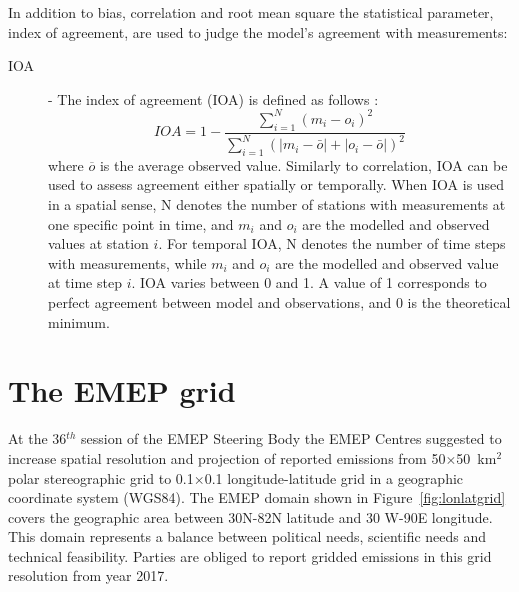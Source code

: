 In addition to bias, correlation and root mean square the statistical
parameter, index of agreement, are used to judge the model's agreement
with measurements:\\
\begin{description}
     \item[IOA]  - The index of agreement (IOA) is defined as follows
     \citep{Willmott1981, Willmott1982}:
\begin{equation}
IOA=1-\frac{\sum_{i=1}^{N}(m_i-o_i)^2}{\sum_{i=1}^{N}(|m_i-\bar{o}|+|o_i-\bar{o}|)^2}
\label{eq:IOA}
\end{equation}
     where $\overline{o}$ is the average observed value. Similarly to
     correlation, IOA can be used to assess agreement either
     spatially or temporally.
     When IOA is used in a spatial sense, N denotes the number of stations
     with measurements at one specific point in time, and $m_i$ and $o_i$
     are the modelled and observed values at station $i$.
     For temporal IOA, N denotes the number of time steps with measurements,
     while $m_i$ and $o_i$ are the modelled and observed value at time step $i$.
     IOA varies between 0 and 1. A value of 1 corresponds to perfect agreement
     between model and observations, and 0 is the theoretical minimum.

\end{description}


\section{The EMEP grid}
\label{EMEPgrid}

At the 36$^{th}$ session of the EMEP Steering Body the EMEP Centres suggested 
to increase spatial resolution and projection of reported emissions from 50$\times$50~km$^{2}$ polar stereographic grid to {0.1\degrees $\times$0.1\degrees} longitude-latitude grid in a geographic coordinate system 
(WGS84). The EMEP domain shown in Figure~\ref{fig:lonlatgrid} covers 
the geographic area between 30\degrees N-82\degrees N latitude and 30\degrees 
W-90\degrees E longitude. This domain 
represents a balance between political needs, scientific needs and technical 
feasibility. Parties are obliged to report gridded emissions in this grid resolution from year 2017.


